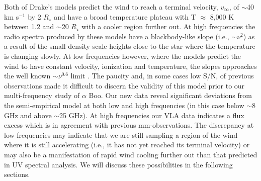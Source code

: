 \documentclass[iop]{emulateapj}
\begin{document}
Both of Drake's models predict the wind to reach a terminal velocity, $v_{\infty}$, of $\sim$40 km s${}^{-1}$ by 2 $R _{\star}$ and have a broad temperature plateau with T $\approx$ 8,000 K between 1.2 and $\sim$20 $R _{\star}$ with a cooler region further out. At high frequencies the radio spectra produced by these models have a blackbody-like slope (i.e., $\sim\nu ^{2}$) as a result of the small density scale heights close to the star where the temperature is changing slowly. At low frequencies however, where the models predict the wind to have constant velocity, ionization and temperature, the slopes approaches the well known $\sim\nu ^{0.6}$ limit \citep{1975MNRAS.170...41W,1975AA....39..217O,1975AA....39....1P}. The paucity and, in some cases low S/N, of previous observations made it difficult to discern the validity of this model prior to our multi-frequency study of $\alpha$ Boo. Our new data reveal significant deviations from the semi-empirical model at both low and high frequencies (in this case below $\sim$8 GHz and above $\sim$25 GHz). At high frequencies our VLA data indicates a flux excess which is in agreement with previous mm-observations. The  discrepancy at low frequencies may indicate that we are still sampling a region of the wind where it is still accelerating (i.e., it has not yet reached its terminal velocity) or may also be a manifestation of rapid wind cooling further out than that predicted in UV spectral analysis. We will discuss these possibilities in the following sections.
\end{document}
